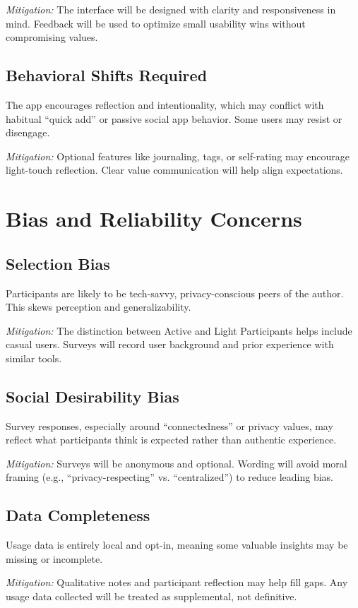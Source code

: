 \documentclass{imc-inf}
\begin{document}
\textit{Mitigation:} The interface will be designed with clarity and responsiveness in mind. Feedback will be used to optimize small usability wins without compromising values.

\subsection*{Behavioral Shifts Required}
The app encourages reflection and intentionality, which may conflict with habitual “quick add” or passive social app behavior. Some users may resist or disengage.

\textit{Mitigation:} Optional features like journaling, tags, or self-rating may encourage light-touch reflection. Clear value communication will help align expectations.

\section{Bias and Reliability Concerns}

\subsection*{Selection Bias}
Participants are likely to be tech-savvy, privacy-conscious peers of the author. This skews perception and generalizability.

\textit{Mitigation:} The distinction between Active and Light Participants helps include casual users. Surveys will record user background and prior experience with similar tools.

\subsection*{Social Desirability Bias}
Survey responses, especially around “connectedness” or privacy values, may reflect what participants think is expected rather than authentic experience.

\textit{Mitigation:} Surveys will be anonymous and optional. Wording will avoid moral framing (e.g., “privacy-respecting” vs. “centralized”) to reduce leading bias.

\subsection*{Data Completeness}
Usage data is entirely local and opt-in, meaning some valuable insights may be missing or incomplete.

\textit{Mitigation:} Qualitative notes and participant reflection may help fill gaps. Any usage data collected will be treated as supplemental, not definitive.
\end{document}
